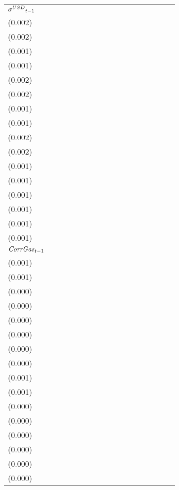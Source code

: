 \begin{tabular}{lllllllllllllllll}
${{\it \sigma}^{USD}}_{t-1}$ &   \makecell{$0.027^{**}$ \\(0.002)} &   \makecell{$0.026^{**}$ \\(0.002)} &   \makecell{$0.005^{**}$ \\(0.001)} &   \makecell{$0.004^{**}$ \\(0.001)} &   \makecell{$0.007^{**}$ \\(0.002)} &   \makecell{$0.005^{**}$ \\(0.002)} &     \makecell{$0.001^{}$ \\(0.001)} &     \makecell{$0.001^{}$ \\(0.001)} &   \makecell{$0.006^{**}$ \\(0.002)} &    \makecell{$0.004^{*}$ \\(0.002)} &    \makecell{$0.000^{}$ \\(0.001)} &    \makecell{$0.000^{}$ \\(0.001)} &   \makecell{$0.008^{**}$ \\(0.001)} &  \makecell{$0.008^{**}$ \\(0.001)} &   \makecell{$0.001^{*}$ \\(0.001)} &   \makecell{$0.001^{*}$ \\(0.001)} \\
${{\it CorrGas}}_{t-1}$      &   \makecell{$0.003^{**}$ \\(0.001)} &   \makecell{$0.003^{**}$ \\(0.001)} &   \makecell{$0.001^{**}$ \\(0.000)} &    \makecell{$0.001^{*}$ \\(0.000)} &     \makecell{$0.000^{}$ \\(0.000)} &     \makecell{$0.000^{}$ \\(0.000)} &     \makecell{$0.000^{}$ \\(0.000)} &     \makecell{$0.000^{}$ \\(0.000)} &     \makecell{$0.001^{}$ \\(0.001)} &     \makecell{$0.001^{}$ \\(0.001)} &    \makecell{$0.000^{}$ \\(0.000)} &    \makecell{$0.000^{}$ \\(0.000)} &   \makecell{$0.002^{**}$ \\(0.000)} &  \makecell{$0.002^{**}$ \\(0.000)} &  \makecell{$0.001^{**}$ \\(0.000)} &  \makecell{$0.001^{**}$ \\(0.000)} \\

\end{tabular}
